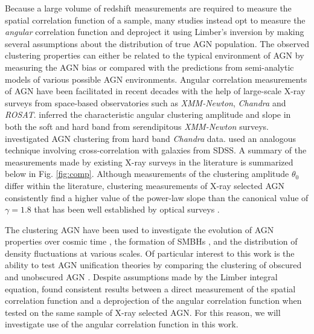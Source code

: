 \documentclass[preprint]{aastex63}
\begin{document}
Because a large volume of redshift measurements are required to measure the spatial correlation function of a sample, many studies instead opt 
to measure the \textit{angular} correlation function and deproject it using Limber's inversion \citep{limber} by making several assumptions about 
the distribution of true AGN population. 
The observed clustering properties can either be related to the typical environment of AGN by measuring the AGN bias \citep[see below]{tinker:2005} or compared with the predictions from semi-analytic models of various possible AGN environments.  
Angular correlation measurements of AGN have been facilitated in recent decades with the help of large-scale X-ray surveys from space-based observatories 
such as \textit{XMM-Newton}, \textit{Chandra} and \textit{ROSAT}. \citet{elyiv,ebrero,gandhi} inferred the characteristic angular clustering amplitude and slope 
in both the soft and hard band from serendipitous \textit{XMM-Newton} surveys. \citet{koutoulidis} investigated AGN clustering from hard band \textit{Chandra} data. \citet{miyaji} used an analogous 
technique involving cross-correlation with galaxies from SDSS. A summary of the measurements made by existing X-ray surveys in the literature 
is summarized below in Fig. \ref{fig:comp}. Although measurements of the clustering amplitude $\theta_0$ differ within the literature, 
clustering measurements of X-ray selected AGN consistently find a higher value of the power-law slope than the 
canonical value of $\gamma = 1.8$ that has been well established by optical surveys \citep{peebles:1980}.

The clustering AGN have been used to investigate the evolution of AGN properties over cosmic time \citep{koutoulidis_2},
the formation of SMBHs \citep{miyaji}, and the distribution of density fluctuations at various scales. Of particular interest to this work is the ability to test AGN unification theories
by comparing the clustering of obscured and unobscured AGN \citep{ebrero}. 
Despite assumptions made by the Limber integral equation, \citet{koutoulidis} found consistent results between a direct measurement of the 
spatial correlation function and a deprojection of the angular correlation function when tested on the same sample of X-ray selected AGN. 
For this reason, we will investigate use of the angular correlation function in this work. 




\end{document}
